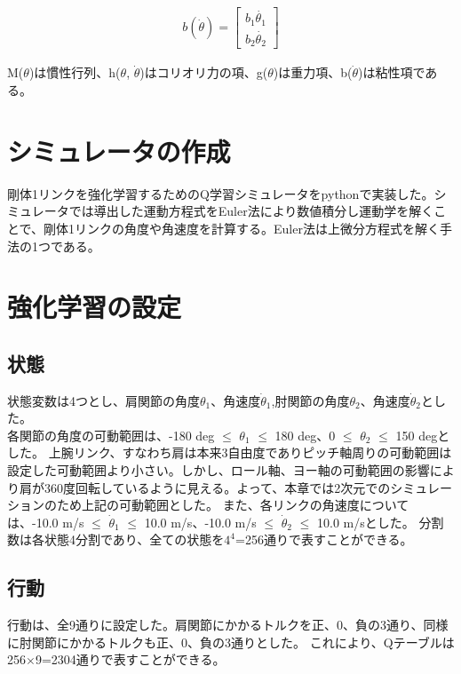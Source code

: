 \begin{eqnarray}
  b(\dot{\theta})=
            \begin{bmatrix}
              b_{1}\dot{\theta_{1}} \\
              b_{2}\dot{\theta_{2}}
            \end{bmatrix}
\end{eqnarray}

M($\theta$)は慣性行列、h($\theta$, $\dot{\theta}$)はコリオリ力の項、g($\theta$)は重力項、b($\dot{\theta}$)は粘性項である。
\section{シミュレータの作成}
剛体1リンクを強化学習するためのQ学習シミュレータをpythonで実装した。シミュレータでは導出した運動方程式をEuler法により数値積分し運動学を解くことで、剛体1リンクの角度や角速度を計算する。Euler法は上微分方程式を解く手法の1つである。
\section{強化学習の設定}
\subsection{状態}
状態変数は4つとし、肩関節の角度$\theta_{1}$、角速度$\dot{\theta}_{1}$,肘関節の角度$\theta_{2}$、角速度$\dot{\theta}_{2}$とした。\\
各関節の角度の可動範囲は、-180 deg $\le$ $\theta_{1}$ $\le$ 180 deg、0 $\le$ $\theta_{2}$ $\le$ 150 degとした。
上腕リンク、すなわち肩は本来3自由度でありピッチ軸周りの可動範囲は設定した可動範囲より小さい。しかし、ロール軸、ヨー軸の可動範囲の影響により肩が360度回転しているように見える。よって、本章では2次元でのシミュレーションのため上記の可動範囲とした。
また、各リンクの角速度については、-10.0 m/s $\le$ $\dot{\theta}_{1}$ $\le$ 10.0 m/s、-10.0 m/s $\le$ $\dot{\theta}_{2}$ $\le$ 10.0 m/sとした。
分割数は各状態4分割であり、全ての状態を$4^{4}$=256通りで表すことができる。
\subsection{行動}
行動は、全9通りに設定した。肩関節にかかるトルクを正、0、負の3通り、同様に肘関節にかかるトルクも正、0、負の3通りとした。
これにより、Qテーブルは256$\times$9=2304通りで表すことができる。
